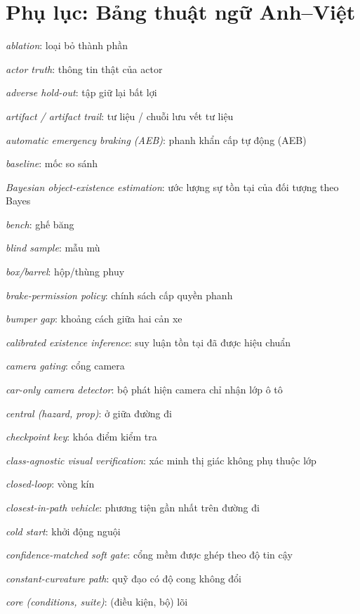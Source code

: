\documentclass[conference]{IEEEtran}
\begin{document}
\section*{Phụ lục: Bảng thuật ngữ Anh–Việt}
{\footnotesize\setlength{\parindent}{0pt}\setlength{\parskip}{1pt}
\textit{ablation}: loại bỏ thành phần\par
\textit{actor truth}: thông tin thật của actor\par
\textit{adverse hold-out}: tập giữ lại bất lợi\par
\textit{artifact / artifact trail}: tư liệu / chuỗi lưu vết tư liệu\par
\textit{automatic emergency braking (AEB)}: phanh khẩn cấp tự động (AEB)\par
\textit{baseline}: mốc so sánh\par
\textit{Bayesian object-existence estimation}: ước lượng sự tồn tại của đối tượng theo Bayes\par
\textit{bench}: ghế băng\par
\textit{blind sample}: mẫu mù\par
\textit{box/barrel}: hộp/thùng phuy\par
\textit{brake-permission policy}: chính sách cấp quyền phanh\par
\textit{bumper gap}: khoảng cách giữa hai cản xe\par
\textit{calibrated existence inference}: suy luận tồn tại đã được hiệu chuẩn\par
\textit{camera gating}: cổng camera\par
\textit{car-only camera detector}: bộ phát hiện camera chỉ nhận lớp ô tô\par
\textit{central (hazard, prop)}: ở giữa đường đi\par
\textit{checkpoint key}: khóa điểm kiểm tra\par
\textit{class-agnostic visual verification}: xác minh thị giác không phụ thuộc lớp\par
\textit{closed-loop}: vòng kín\par
\textit{closest-in-path vehicle}: phương tiện gần nhất trên đường đi\par
\textit{cold start}: khởi động nguội\par
\textit{confidence-matched soft gate}: cổng mềm được ghép theo độ tin cậy\par
\textit{constant-curvature path}: quỹ đạo có độ cong không đổi\par
\textit{core (conditions, suite)}: (điều kiện, bộ) lõi\par
}
\end{document}
